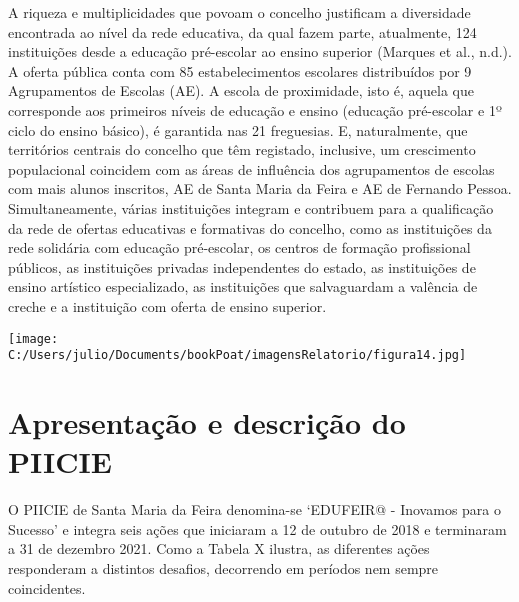 \documentclass[
]{book}
\begin{document}
A riqueza e multiplicidades que povoam o concelho justificam a diversidade encontrada ao nível da rede educativa, da qual fazem parte, atualmente, 124 instituições desde a educação pré-escolar ao ensino superior (Marques et al., n.d.). A oferta pública conta com 85 estabelecimentos escolares distribuídos por 9 Agrupamentos de Escolas (AE). A escola de proximidade, isto é, aquela que corresponde aos primeiros níveis de educação e ensino (educação pré-escolar e 1º ciclo do ensino básico), é garantida nas 21 freguesias. E, naturalmente, que territórios centrais do concelho que têm registado, inclusive, um crescimento populacional coincidem com as áreas de influência dos agrupamentos de escolas com mais alunos inscritos, AE de Santa Maria da Feira e AE de Fernando Pessoa. Simultaneamente, várias instituições integram e contribuem para a qualificação da rede de ofertas educativas e formativas do concelho, como as instituições da rede solidária com educação pré-escolar, os centros de formação profissional públicos, as instituições privadas independentes do estado, as instituições de ensino artístico especializado, as instituições que salvaguardam a valência de creche e a instituição com oferta de ensino superior.

\texttt{[image: C:/Users/julio/Documents/bookPoat/imagensRelatorio/figura14.jpg]}

\hypertarget{apresentauxe7uxe3o-e-descriuxe7uxe3o-do-piicie}{%
\section{Apresentação e descrição do PIICIE}\label{apresentauxe7uxe3o-e-descriuxe7uxe3o-do-piicie}}

O PIICIE de Santa Maria da Feira denomina-se `EDUFEIR@ - Inovamos para o Sucesso' e integra seis ações que iniciaram a 12 de outubro de 2018 e terminaram a 31 de dezembro 2021. Como a Tabela X ilustra, as diferentes ações responderam a distintos desafios, decorrendo em períodos nem sempre coincidentes.
\end{document}
